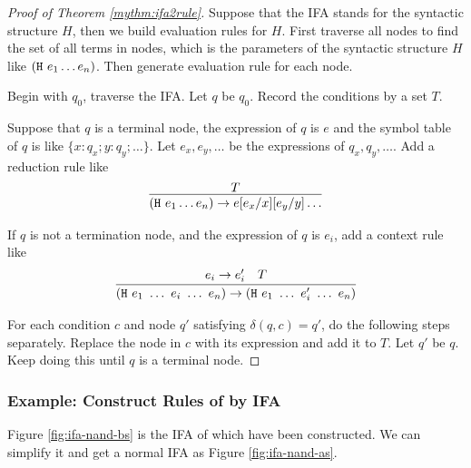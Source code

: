 \begin{proof}[Proof of Theorem \ref{mythm:ifa2rule}]

    Suppose that the IFA stands for the syntactic structure $H$, then we build evaluation rules for $H$. First traverse all nodes to find the set of all terms in nodes, which is the parameters of the syntactic structure $H$ like $(\mbox{\tt H}~e_1 \ldots e_n)$. Then generate evaluation rule for each node.

    Begin with $q_0$, traverse the IFA. Let $q$ be $q_0$. Record the conditions by a set $T$.

    Suppose that $q$ is a terminal node, the expression of $q$ is $e$ and the symbol table of $q$ is like $\{x:q_x; y:q_y; \ldots\}$. Let $e_x,e_y,\ldots$ be the expressions of $q_x, q_y, \ldots$. Add a reduction rule like
    \[
        \infer{(\m{H}~e_1 \ldots e_n) \to e[e_x/x][e_y/y]\ldots}{T}
    \]

    If $q$ is not a termination node, and the expression of $q$ is $e_i$, add a context rule like
    \[
        \infer{(\m{H}~e_1~\ldots~e_i~\ldots~e_n) \to (\m{H}~e_1~\ldots~e_i'~\ldots~e_n)}{e_i \to e_i' \quad T}
    \]


    For each condition $c$ and node $q'$ satisfying $\delta(q, c)=q'$, do the following steps separately. Replace the node in $c$ with its expression and add it to $T$. Let $q'$ be $q$. Keep doing this until $q$ is a terminal node.
\end{proof}

\subsubsection{Example: Construct Rules of  by IFA}

Figure \ref{fig:ifa-nand-bs} is the IFA of  which have been constructed. We can simplify it and get a normal IFA as Figure \ref{fig:ifa-nand-as}.

